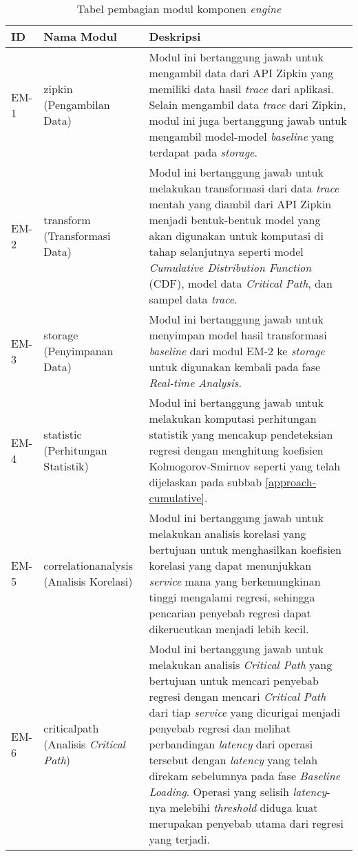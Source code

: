 \begin{small}
	\begin{longtable}{ | p{1cm} | p{3cm} | p{10cm} | }
		\caption{Tabel pembagian modul komponen \textit{engine}}
		\label{engine-module}                                                           
		\\ \hline
		\centering\bfseries{ID} & \centering\bfseries{Nama Modul} & \centering\bfseries{Deskripsi} \tabularnewline \hline
		\endfirsthead
		EM-1 & zipkin (Pengambilan Data) & Modul ini bertanggung jawab untuk mengambil data dari API Zipkin yang memiliki data hasil \textit{trace} dari aplikasi. Selain mengambil data \textit{trace} dari Zipkin, modul ini juga bertanggung jawab untuk mengambil model-model \textit{baseline} yang terdapat pada \textit{storage}. \\ \hline
		EM-2 & transform (Transformasi Data) & Modul ini bertanggung jawab untuk melakukan transformasi dari data \textit{trace} mentah yang diambil dari API Zipkin menjadi bentuk-bentuk model yang akan digunakan untuk komputasi di tahap selanjutnya seperti model \textit{Cumulative Distribution Function} (CDF), model data \textit{Critical Path}, dan sampel data \textit{trace}. \\ \hline
		EM-3 & storage (Penyimpanan Data) & Modul ini bertanggung jawab untuk menyimpan model hasil transformasi \textit{baseline} dari modul EM-2 ke \textit{storage} untuk digunakan kembali pada fase \textit{Real-time Analysis}. \\ \hline
		EM-4 & statistic (Perhitungan Statistik) & Modul ini bertanggung jawab untuk melakukan komputasi perhitungan statistik yang mencakup pendeteksian regresi dengan menghitung koefisien Kolmogorov-Smirnov seperti yang telah dijelaskan pada subbab \ref{approach-cumulative}. \\ \hline
		EM-5 & correlation\textunderscore analysis (Analisis Korelasi) & Modul ini bertanggung jawab untuk melakukan analisis korelasi yang bertujuan untuk menghasilkan koefisien korelasi yang dapat menunjukkan \textit{service} mana yang berkemungkinan tinggi mengalami regresi, sehingga pencarian penyebab regresi dapat dikerucutkan menjadi lebih kecil. \\ \hline
		EM-6 & critical\textunderscore path (Analisis \textit{Critical Path}) & Modul ini bertanggung jawab untuk melakukan analisis \textit{Critical Path} yang bertujuan untuk mencari penyebab regresi dengan mencari \textit{Critical Path} dari tiap \textit{service} yang dicurigai menjadi penyebab regresi dan melihat perbandingan \textit{latency} dari operasi tersebut dengan \textit{latency} yang telah direkam sebelumnya pada fase \textit{Baseline Loading}. Operasi yang selisih \textit{latency}-nya melebihi \textit{threshold} diduga kuat merupakan penyebab utama dari regresi yang terjadi. \\ \hline

\end{longtable}
\end{small}
